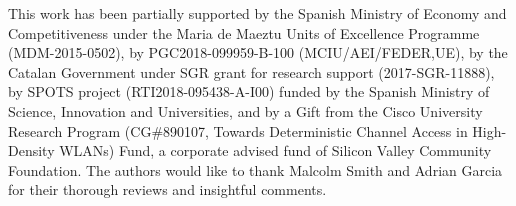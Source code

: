 \documentclass[preprint,12pt]{elsarticle}
\begin{document}
This  work  has  been  partially  supported  by  the  Spanish Ministry of Economy and Competitiveness under the Maria de Maeztu  Units  of  Excellence  Programme  (MDM-2015-0502), by PGC2018-099959-B-100 (MCIU/AEI/FEDER,UE), by the Catalan Government under SGR grant for research support (2017-SGR-11888), by SPOTS project (RTI2018-095438-A-I00) funded by the Spanish Ministry of Science, Innovation and Universities, and  by a Gift from the Cisco University Research Program (CG\#890107, Towards Deterministic Channel Access in High-Density WLANs) Fund, a corporate advised fund of Silicon Valley Community Foundation.
The authors would like to thank Malcolm Smith and Adrian Garcia for their thorough reviews and insightful comments.
	



\end{document}
